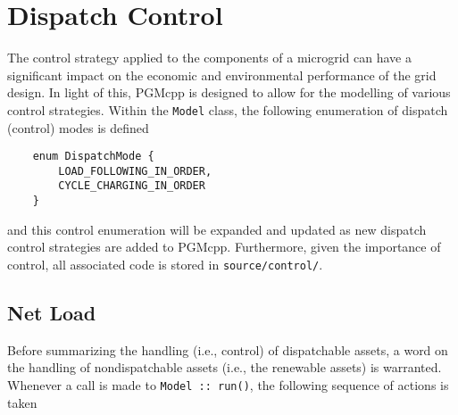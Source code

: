 \documentclass[12pt, letterpaper]{report}
\begin{document}
\begin{table}[H]
    \centering
    \caption{\texttt{LiIon} attribute descriptions}
    \label{tab:LiIon_attributes}
\end{table}

\chapter{Dispatch Control}

The control strategy applied to the components of a microgrid can have a significant impact on the economic and environmental performance of the grid design. In light of this, PGMcpp is designed to allow for the modelling of various control strategies. Within the \texttt{Model} class, the following enumeration of dispatch (control) modes is defined

\begin{verbatim}
    enum DispatchMode {
        LOAD_FOLLOWING_IN_ORDER,
        CYCLE_CHARGING_IN_ORDER
    }
\end{verbatim}

\noindent and this control enumeration will be expanded and updated as new dispatch control strategies are added to PGMcpp. Furthermore, given the importance of control, all associated code is stored in \texttt{source/control/}.

\section{Net Load}

Before summarizing the handling (i.e., control) of dispatchable assets, a word on the handling of nondispatchable assets (i.e., the renewable assets) is warranted. Whenever a call is made to \texttt{Model :: run()}, the following sequence of actions is taken
\end{document}
